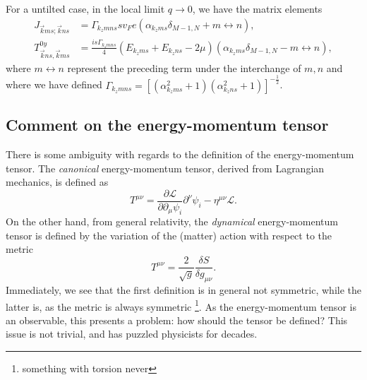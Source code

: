 \begin{summary}
  For a untilted case, in the local limit \( q\to 0 \), we have the matrix elements
  \begin{align}
    J_{\vec{k} ms; \vec{k} ns}&=
                                \Gamma_{k_z m n s}
                                sv_F e
                                \left(
                                \alpha_{k_z m s} \delta _{M-1, N}
                                + m\leftrightarrow n
                                \right),\\
    T^{0y}_{\vec{k} ns, \vec{k}ms} &=
                                           \frac{is \Gamma_{k_z m n s}}{4}
                                           \left(E_{k_z m s} + E_{k_z n s}- 2\mu \right)
                                           \left(
                                           \alpha_{k_z m s} \delta_{M-1, N}
                                           -
                                           m\leftrightarrow n
                                           \right),
  \end{align}
where \( m \leftrightarrow n \) represent the preceding term under the interchange of \( m, n \) and where we have defined
$
\Gamma_{k_z m n s} =
\left[(\alpha_{k_zm s}^2 + 1) (\alpha_{k_z n s}^2 + 1) \right]^{-\frac{1}{2}}
$.
\end{summary}

\subsection{Comment on the energy-momentum tensor}
There is some ambiguity with regards to the definition of the energy-momentum tensor\cites{kachelriessQuantumFieldsHubble2018}{chernodubThermalTransportGeometry2021}{vanderwurffMagnetovorticalThermoelectricTransport2019}{forgerCurrentsEnergyMomentumTensor2004}.
The \emph{canonical} energy-momentum tensor, derived from Lagrangian mechanics, is defined as
\begin{equation}
	T^{\mu \nu } = \frac{\partial \mathcal{L}}{\partial \partial _{\mu } \psi_i } \partial ^{\nu } \psi_i - \eta^{\mu \nu } \mathcal{L}.
\end{equation}
On the other hand, from general relativity, the \emph{dynamical} energy-momentum tensor is defined by the variation of the (matter) action with respect to the metric\cite{kachelriessQuantumFieldsHubble2018}
\begin{equation}
	T^{\mu \nu} = \frac{2}{\sqrt{g} } \frac{\delta S}{\delta g_{\mu \nu}}.
\end{equation}
Immediately, we see that the first definition is in general not symmetric, while the latter is, as the metric is always symmetric \footnote{something with torsion never}.
As the energy-momentum tensor is an observable, this presents a problem:
how should the tensor be defined?
This issue is not trivial, and has puzzled physicists for decades\cite{forgerCurrentsEnergyMomentumTensor2004}.

